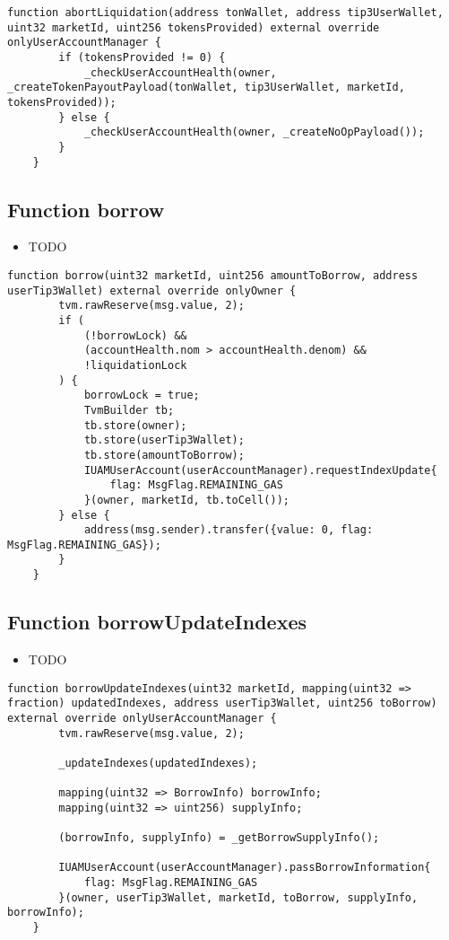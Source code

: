 \begin{lstlisting}[firstnumber=327]
    function abortLiquidation(address tonWallet, address tip3UserWallet, uint32 marketId, uint256 tokensProvided) external override onlyUserAccountManager {
        if (tokensProvided != 0) { 
            _checkUserAccountHealth(owner, _createTokenPayoutPayload(tonWallet, tip3UserWallet, marketId, tokensProvided));
        } else {
            _checkUserAccountHealth(owner, _createNoOpPayload());
        }
    }
\end{lstlisting}

\subsection{Function borrow}

\noindent\begin{itemize}
\item TODO
\end{itemize}

\begin{lstlisting}[firstnumber=169]
    function borrow(uint32 marketId, uint256 amountToBorrow, address userTip3Wallet) external override onlyOwner {
        tvm.rawReserve(msg.value, 2);
        if (
            (!borrowLock) &&
            (accountHealth.nom > accountHealth.denom) &&
            !liquidationLock
        ) {
            borrowLock = true;
            TvmBuilder tb;
            tb.store(owner);
            tb.store(userTip3Wallet);
            tb.store(amountToBorrow);
            IUAMUserAccount(userAccountManager).requestIndexUpdate{
                flag: MsgFlag.REMAINING_GAS
            }(owner, marketId, tb.toCell());
        } else {
            address(msg.sender).transfer({value: 0, flag: MsgFlag.REMAINING_GAS});
        }
    }
\end{lstlisting}

\subsection{Function borrowUpdateIndexes}

\noindent\begin{itemize}
\item TODO
\end{itemize}

\begin{lstlisting}[firstnumber=189]
    function borrowUpdateIndexes(uint32 marketId, mapping(uint32 => fraction) updatedIndexes, address userTip3Wallet, uint256 toBorrow) external override onlyUserAccountManager {
        tvm.rawReserve(msg.value, 2);

        _updateIndexes(updatedIndexes);

        mapping(uint32 => BorrowInfo) borrowInfo;
        mapping(uint32 => uint256) supplyInfo;

        (borrowInfo, supplyInfo) = _getBorrowSupplyInfo();

        IUAMUserAccount(userAccountManager).passBorrowInformation{
            flag: MsgFlag.REMAINING_GAS
        }(owner, userTip3Wallet, marketId, toBorrow, supplyInfo, borrowInfo);
    }
\end{lstlisting}

